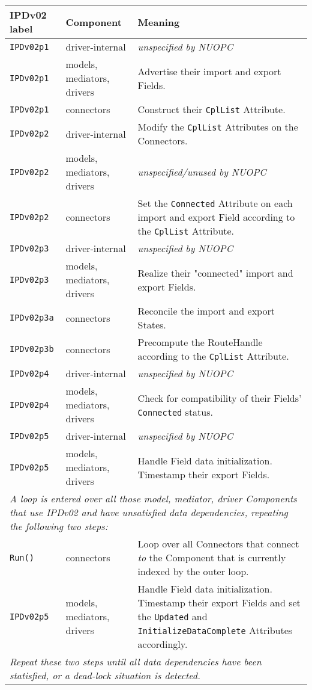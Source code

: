 \vspace*{3ex}
\begin{longtable}[h]{|p{35mm}|p{4cm}|p{6cm}|}
     \hline\hline
     {\bf IPDv02 label} & {\bf Component} & {\bf Meaning}\\
     \hline\hline
     {\tt IPDv02p1} & driver-internal             & {\em unspecified by NUOPC}\\ \hline
     {\tt IPDv02p1} & models, mediators, drivers  & Advertise their import and export Fields.\\ \hline
     {\tt IPDv02p1} & connectors                  & Construct their {\tt CplList} Attribute.\\ \hline
     {\tt IPDv02p2} & driver-internal             & Modify the {\tt CplList} Attributes on the Connectors.\\ \hline
     {\tt IPDv02p2} & models, mediators, drivers  & {\em unspecified/unused by NUOPC}\\ \hline
     {\tt IPDv02p2} & connectors                  & Set the {\tt Connected} Attribute on each import and export Field according to the {\tt CplList} Attribute.\\ \hline
     {\tt IPDv02p3} & driver-internal             & {\em unspecified by NUOPC}\\ \hline
     {\tt IPDv02p3} & models, mediators, drivers  & Realize their "connected" import and export Fields.\\ \hline
     {\tt IPDv02p3a}& connectors                  & Reconcile the import and export States.\\ \hline
     {\tt IPDv02p3b}& connectors                  & Precompute the RouteHandle according to the {\tt CplList} Attribute.\\ \hline
     {\tt IPDv02p4} & driver-internal             & {\em unspecified by NUOPC}\\ \hline
     {\tt IPDv02p4} & models, mediators, drivers  & Check for compatibility of their Fields' {\tt Connected} status.\\ \hline
     {\tt IPDv02p5} & driver-internal             & {\em unspecified by NUOPC}\\ \hline
     {\tt IPDv02p5} & models, mediators, drivers  & Handle Field data initialization. Timestamp their export Fields.\\ \hline
     \multicolumn{3}{|p{13.5cm}|}{\it A loop is entered over all those model, mediator, driver Components that use IPDv02 and have
     unsatisfied data dependencies, repeating the following two steps:}\\ \hline
     {\tt Run()}    & connectors                  & Loop over all Connectors that connect {\it to} the Component that is currently indexed by the outer loop.\\ \hline
     {\tt IPDv02p5} & models, mediators, drivers  & Handle Field data initialization. Timestamp their export Fields and set the {\tt Updated} and {\tt InitializeDataComplete} Attributes accordingly.\\ \hline
     \multicolumn{3}{|p{13.5cm}|}{\it Repeat these two steps until all data
     dependencies have been statisfied, or a dead-lock situation is detected.}\\ 
     \hline\hline
\end{longtable}

